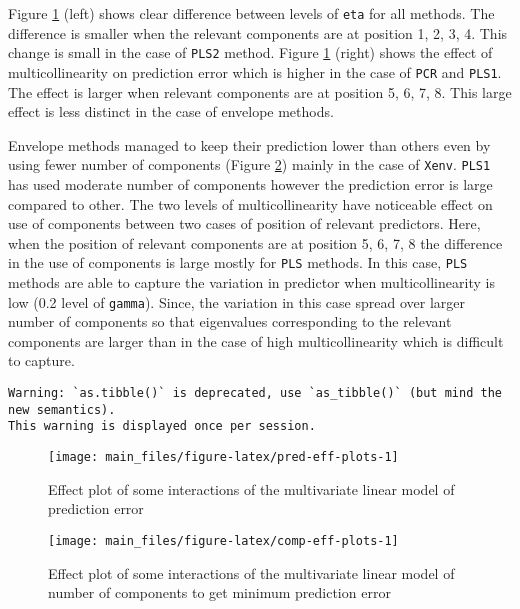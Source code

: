 \documentclass[12pt,3p,authoryear]{elsarticle}
\begin{document}
Figure \ref{fig:pred-eff-plots} (left) shows clear difference between
levels of \texttt{eta} for all methods. The difference is smaller when
the relevant components are at position 1, 2, 3, 4. This change is small
in the case of \texttt{PLS2} method. Figure \ref{fig:pred-eff-plots}
(right) shows the effect of multicollinearity on prediction error which
is higher in the case of \texttt{PCR} and \texttt{PLS1}. The effect is
larger when relevant components are at position 5, 6, 7, 8. This large
effect is less distinct in the case of envelope methods.

Envelope methods managed to keep their prediction lower than others even
by using fewer number of components (Figure \ref{fig:comp-eff-plots})
mainly in the case of \texttt{Xenv}. \texttt{PLS1} has used moderate
number of components however the prediction error is large compared to
other. The two levels of multicollinearity have noticeable effect on use
of components between two cases of position of relevant predictors.
Here, when the position of relevant components are at position 5, 6, 7,
8 the difference in the use of components is large mostly for
\texttt{PLS} methods. In this case, \texttt{PLS} methods are able to
capture the variation in predictor when multicollinearity is low (0.2
level of \texttt{gamma}). Since, the variation in this case spread over
larger number of components so that eigenvalues corresponding to the
relevant components are larger than in the case of high
multicollinearity which is difficult to capture.




\begin{verbatim}
Warning: `as.tibble()` is deprecated, use `as_tibble()` (but mind the new semantics).
This warning is displayed once per session.
\end{verbatim}

\begin{figure}
\texttt{[image: main\_files/figure-latex/pred-eff-plots-1]} \caption{Effect plot of some interactions of the multivariate
linear model of prediction error}\label{fig:pred-eff-plots}
\end{figure}




\begin{figure}
\texttt{[image: main\_files/figure-latex/comp-eff-plots-1]} \caption{Effect plot of some interactions of the multivariate
linear model of number of components to get minimum prediction error}\label{fig:comp-eff-plots}
\end{figure}
\end{document}
